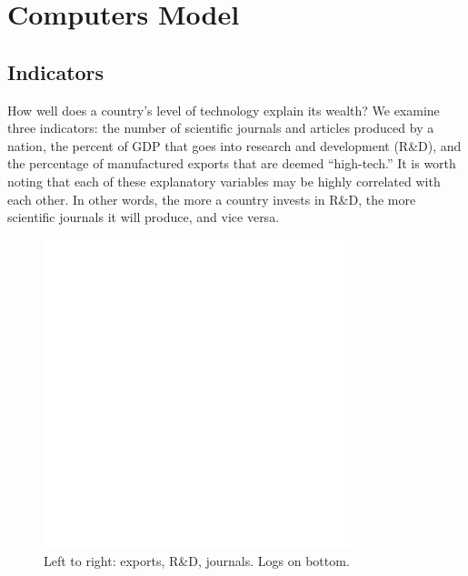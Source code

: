 \documentclass[11pt]{article}
\begin{document}
\section{Computers Model}
\label{sec:model_tech}

\subsection{Indicators}
How well does a country's level of technology explain its wealth? We examine three indicators: the number of scientific journals and articles produced by a nation, the percent of GDP that goes into research and development (R\&D), and the percentage of manufactured exports that are deemed ``high-tech.'' It is worth noting that each of these explanatory variables may be highly correlated with each other. In other words, the more a country invests in R\&D, the more scientific journals it will produce, and vice versa.

\begin{figure}[!ht]
  \centering
  \includegraphics[width=0.8\textwidth]{images/science_model_scatter}
  \caption{\label{science_model_scatter}Left to right: exports, R\&D, journals. Logs on bottom.}
\end{figure}
\end{document}

